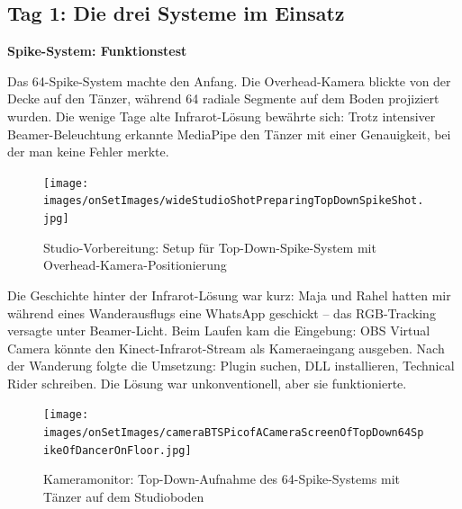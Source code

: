 \newpage

\subsection{Tag 1: Die drei Systeme im Einsatz}

\textbf{Spike-System: Funktionstest}

Das 64-Spike-System machte den Anfang. Die Overhead-Kamera blickte von der Decke auf den Tänzer, während 64 radiale Segmente auf dem Boden projiziert wurden. Die wenige Tage alte Infrarot-Lösung bewährte sich: Trotz intensiver Beamer-Beleuchtung erkannte MediaPipe den Tänzer mit einer Genauigkeit, bei der man keine Fehler merkte.

\begin{figure}[h]
   \centering
   \texttt{[image: images/onSetImages/wideStudioShotPreparingTopDownSpikeShot.jpg]}
   \caption{Studio-Vorbereitung: Setup für Top-Down-Spike-System mit Overhead-Kamera-Positionierung}
   \label{fig:topdown_setup}
\end{figure}

Die Geschichte hinter der Infrarot-Lösung war kurz: Maja und Rahel hatten mir während eines Wanderausflugs eine WhatsApp geschickt – das RGB-Tracking versagte unter Beamer-Licht. Beim Laufen kam die Eingebung: OBS Virtual Camera könnte den Kinect-Infrarot-Stream als Kameraeingang ausgeben. Nach der Wanderung folgte die Umsetzung: Plugin suchen, DLL installieren, Technical Rider schreiben. Die Lösung war unkonventionell, aber sie funktionierte.

\begin{figure}[h]
   \centering
   \texttt{[image: images/onSetImages/cameraBTSPicofACameraScreenOfTopDown64SpikeOfDancerOnFloor.jpg]}
   \caption{Kameramonitor: Top-Down-Aufnahme des 64-Spike-Systems mit Tänzer auf dem Studioboden}
   \label{fig:camera_monitor}
\end{figure}

